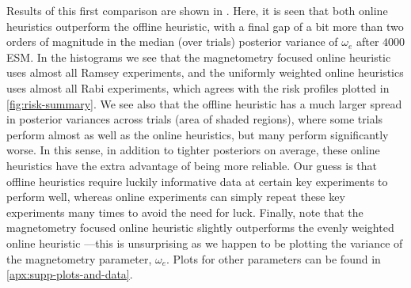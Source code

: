 \documentclass[aps,nofootinbib,twocolumn,superscriptaddress]{revtex4}
\begin{document}
Results of this first comparison
are shown in .
Here, it is seen that both online heuristics outperform the offline heuristic, with a final
gap of a bit more than two orders of magnitude in the median (over trials)
posterior variance of $\omega_e$ after $4000$ ESM.
In the histograms we see that the magnetometry focused online heuristic
uses almost all Ramsey experiments, and the uniformly weighted online heuristics uses
almost all Rabi experiments, which agrees with the risk profiles
plotted in \autoref{fig:risk-summary}.
We see also that the offline heuristic has a much larger spread in posterior
variances across trials (area of shaded regions),
where some trials perform almost as well as the online heuristics,
but many perform significantly worse.
In this sense, in addition to tighter posteriors on average,
these online heuristics have the extra advantage of being
more reliable.
Our guess is that offline heuristics require luckily informative data at certain key
experiments to perform well, whereas online experiments can simply repeat these key
experiments many times to avoid the need for luck.
Finally, note that the magnetometry focused
online heuristic slightly
outperforms the evenly weighted online heuristic ---this
is unsurprising as we happen to be plotting the variance of the magnetometry
parameter, $\omega_e$.
Plots for other parameters can be found in \autoref{apx:supp-plots-and-data}.
\end{document}
